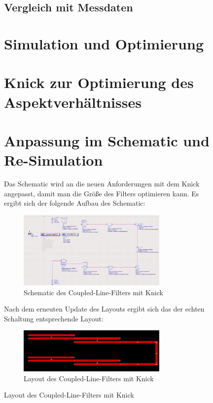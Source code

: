 \begin{figure}[H]
    \subsection{Vergleich mit Messdaten}

\section{Simulation und Optimierung}
    

\section{Knick zur Optimierung des Aspektverhältnisses}

\section{Anpassung im Schematic und Re-Simulation}
    Das Schematic wird an die neuen Anforderungen mit dem Knick angepasst, damit man die Größe des Filters optimieren kann. Es ergibt sich der folgende Aufbau des Schematic:
    \begin{figure}[H]
        \centering
        \includegraphics[width=0.8\textwidth]{Pictures/SchematicMitKnick.png}
        \caption{Schematic des Coupled-Line-Filters mit Knick}
    \end{figure}
    Nach dem erneuten Update des Layouts ergibt sich das der echten Schaltung entsprechende Layout:
    \begin{figure}[H]
        \centering
        \includegraphics[width=0.8\textwidth]{Pictures/LayoutmitKnick.png}
        \caption{Layout des Coupled-Line-Filters mit Knick}

\end{figure}
\end{figure}
